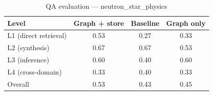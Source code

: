 \begin{table}[h]
\centering
\caption{QA evaluation — neutron_star_physics}
\begin{tabular}{lccc}
\toprule
Level & Graph + store & Baseline & Graph only \\
\midrule
L1 (direct retrieval) & 0.53 & 0.27 & 0.33 \\
L2 (synthesis) & 0.67 & 0.67 & 0.53 \\
L3 (inference) & 0.60 & 0.40 & 0.60 \\
L4 (cross-domain) & 0.33 & 0.40 & 0.33 \\
\midrule
Overall & 0.53 & 0.43 & 0.45 \\
\bottomrule
\end{tabular}
\end{table}